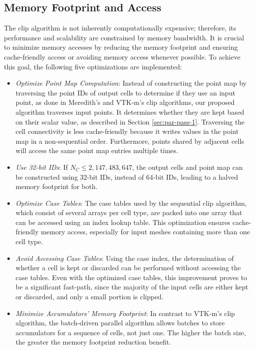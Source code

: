 \documentclass{egpubl}
\begin{document}
\subsection{Memory Footprint and Access}
\label{sec:memory-footprint-and-access}

The clip algorithm is not inherently computationally expensive; therefore, its performance and scalability are constrained by memory bandwidth. It is crucial to minimize memory accesses by reducing the memory footprint and ensuring cache-friendly access or avoiding memory access whenever possible. To achieve this goal, the following five optimizations are implemented:

\begin{itemize}
    \item \textit{Optimize Point Map Computation}: Instead of constructing the point map by traversing the point IDs of output cells to determine if they use an input point, as done in Meredith's and VTK-m's clip algorithms, our proposed algorithm traverses input points. It determines whether they are kept based on their scalar value, as described in Section \ref{sec:par-pass-1}. Traversing the cell connectivity is less cache-friendly because it writes values in the point map in a non-sequential order. Furthermore, points shared by adjacent cells will access the same point map entries multiple times.
    \item \textit{Use 32-bit IDs}: If $N_C \leq 2,147,483,647$, the output cells and point map can be constructed using 32-bit IDs, instead of 64-bit IDs, leading to a halved memory footprint for both.
    \item \textit{Optimize Case Tables}: The case tables used by the sequential clip algorithm, which consist of several arrays per cell type, are packed into one array that can be accessed using an index lookup table. This optimization ensures cache-friendly memory access, especially for input meshes containing more than one cell type. 
    \item \textit{Avoid Accessing Case Tables}: Using the case index, the determination of whether a cell is kept or discarded can be performed without accessing the case tables. Even with the optimized case tables, this improvement proves to be a significant fast-path, since the majority of the input cells are either kept or discarded, and only a small portion is clipped.
    \item \textit{Minimize Accumulators' Memory Footprint}: In contrast to VTK-m's clip algorithm, the batch-driven parallel algorithm allows batches to store accumulators for a sequence of cells, not just one. The higher the batch size, the greater the memory footprint reduction benefit.
\end{itemize}
\end{document}
